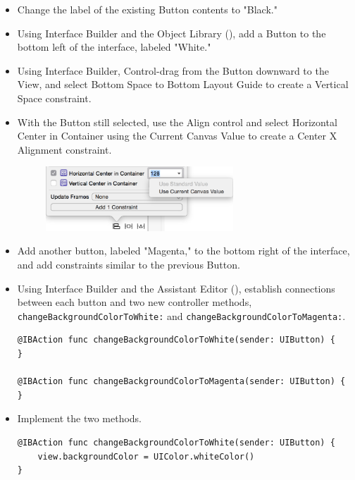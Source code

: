 \documentclass[a4paper,11pt]{scrartcl}
\begin{document}
\begin{itemize}
\item Change the label of the existing Button contents to "Black."
\item Using Interface Builder and the Object Library (), add a Button to the bottom left of the interface, labeled "White."
\item Using Interface Builder, Control-drag from the Button downward to the View, and select Bottom Space to Bottom Layout Guide to create a Vertical Space constraint.
\item With the Button still selected, use the Align control and select Horizontal Center in Container using the Current Canvas Value to create a Center X Alignment constraint.
\begin{figure}[h]
	\begin{center}
   \includegraphics[width=200pt]{align_constraint_lesson_4.png}
	\end{center}
\end{figure}
\item Add another button, labeled "Magenta," to the bottom right of the interface, and add constraints similar to the previous Button.
\item Using Interface Builder and the Assistant Editor (\keys{\Alt+\cmd+\return}), establish connections between each button and two new controller methods, \texttt{changeBackgroundColorToWhite:} and \texttt{changeBackgroundColorToMagenta:}.
\begin{lstlisting}
@IBAction func changeBackgroundColorToWhite(sender: UIButton) {
}

@IBAction func changeBackgroundColorToMagenta(sender: UIButton) {
}
\end{lstlisting}
\item Implement the two methods.
\begin{lstlisting}
@IBAction func changeBackgroundColorToWhite(sender: UIButton) {
	view.backgroundColor = UIColor.whiteColor()
}


\end{lstlisting}
\end{itemize}
\end{document}
